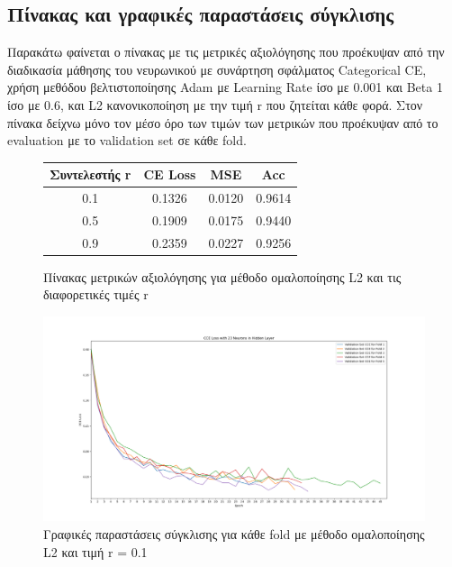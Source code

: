 \documentclass[12pt,a4paper]{article}
\begin{document}
\subsection{Πίνακας και γραφικές παραστάσεις σύγκλισης}

Παρακάτω φαίνεται ο πίνακας με τις μετρικές αξιολόγησης που προέκυψαν από την διαδικασία μάθησης του νευρωνικού με συνάρτηση σφάλματος Categorical CE, χρήση μεθόδου βελτιστοποίησης Adam με Learning Rate ίσο με 0.001 και Beta 1 ίσο με 0.6, και L2 κανονικοποίηση με την τιμή r που ζητείται κάθε φορά. Στον πίνακα δείχνω μόνο τον μέσο όρο των τιμών των μετρικών που προέκυψαν από το evaluation με το validation set σε κάθε fold.

\begin{figure}[H]
    \begin{center}
    \begin{tabular}{ |c|c|c|c| } 
        \hline
        \textbf{Συντελεστής r} & \textbf{CE Loss} & \textbf{MSE} & \textbf{Acc} \\ \hline
        0.1 & 0.1326 & 0.0120 & 0.9614 \\
        \hline
        0.5 & 0.1909 & 0.0175 & 0.9440 \\
        \hline
        0.9 & 0.2359 & 0.0227 & 0.9256 \\ 
        \hline
    \end{tabular}
    \end{center}
    \caption{Πίνακας μετρικών αξιολόγησης για μέθοδο ομαλοποίησης L2 και τις διαφορετικές τιμές r}
\end{figure}

\begin{figure}[H]
	\includegraphics[width=\textwidth]{Screenshots/28. L2 with r = 0.1.png}
	\caption{Γραφικές παραστάσεις σύγκλισης για κάθε fold με μέθοδο ομαλοποίησης L2 και τιμή r = 0.1}
\end{figure}
\end{document}
